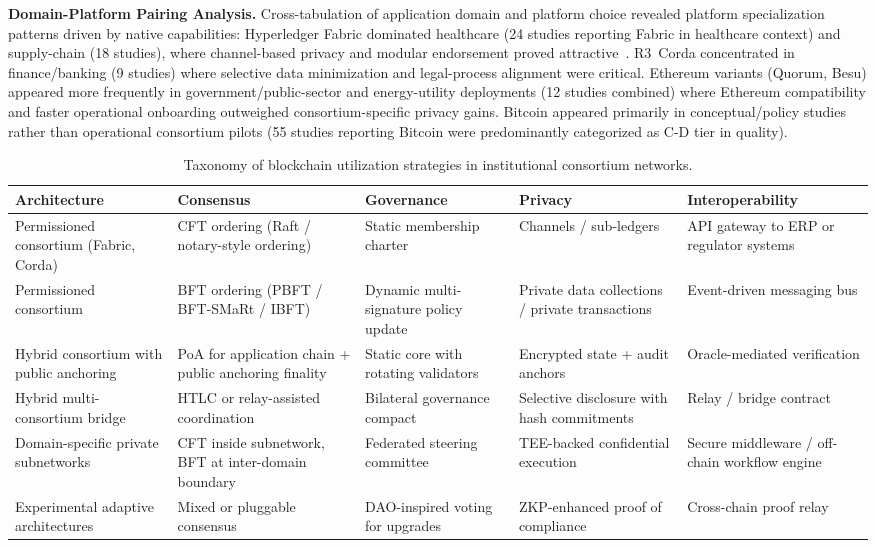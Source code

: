 \documentclass[journal]{IEEEtran}
\begin{document}
\textbf{Domain-Platform Pairing Analysis.}
Cross-tabulation of application domain and platform choice revealed platform specialization patterns driven by native capabilities: Hyperledger Fabric dominated healthcare (24 studies reporting Fabric in healthcare context) and supply-chain (18 studies), where channel-based privacy and modular endorsement proved attractive~\cite{manoharan2024healthinterop,tahir2024healthcare,villarreal2023healthcareinterop}. R3~Corda concentrated in finance/banking (9 studies) where selective data minimization and legal-process alignment were critical. Ethereum variants (Quorum, Besu) appeared more frequently in government/public-sector and energy-utility deployments (12 studies combined) where Ethereum compatibility and faster operational onboarding outweighed consortium-specific privacy gains. Bitcoin appeared primarily in conceptual/policy studies rather than operational consortium pilots (55 studies reporting Bitcoin were predominantly categorized as C-D tier in quality).

\begin{table}[t]
\caption{Taxonomy of blockchain utilization strategies in institutional consortium networks.}
\label{tab:taxonomy}
\centering
\begin{tabular}{p{}p{}p{}p{}p{}}
\toprule
\textbf{Architecture} & \textbf{Consensus} & \textbf{Governance} & \textbf{Privacy} & \textbf{Interoperability} \\
\midrule
Permissioned consortium (Fabric, Corda) & CFT ordering (Raft / notary-style ordering) & Static membership charter & Channels / sub-ledgers & API gateway to ERP or regulator systems \\
Permissioned consortium & BFT ordering (PBFT / BFT-SMaRt / IBFT) & Dynamic multi-signature policy update & Private data collections / private transactions & Event-driven messaging bus \\
Hybrid consortium with public anchoring & PoA for application chain + public anchoring finality & Static core with rotating validators & Encrypted state + audit anchors & Oracle-mediated verification \\
Hybrid multi-consortium bridge & HTLC or relay-assisted coordination & Bilateral governance compact & Selective disclosure with hash commitments & Relay / bridge contract \\
Domain-specific private subnetworks & CFT inside subnetwork, BFT at inter-domain boundary & Federated steering committee & TEE-backed confidential execution & Secure middleware / off-chain workflow engine \\
Experimental adaptive architectures & Mixed or pluggable consensus & DAO-inspired voting for upgrades & ZKP-enhanced proof of compliance & Cross-chain proof relay \\
\bottomrule
\end{tabular}
\end{table}
\end{document}
